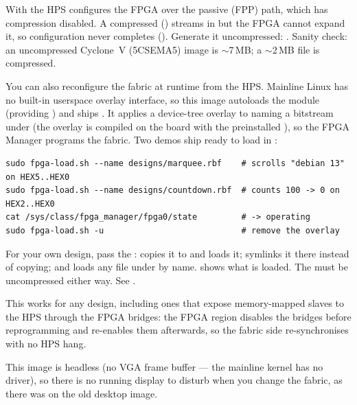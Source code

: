\begin{warn}
With  the HPS configures the FPGA over the passive (FPP) path,
which has compression disabled. A compressed 
() streams in but the FPGA cannot expand it, so
configuration never completes (). Generate it uncompressed:
. Sanity
check: an uncompressed Cyclone~V (5CSEMA5) image is $\sim$7\,MB; a $\sim$2\,MB file
is compressed.
\end{warn}

\begin{note}
You can also reconfigure the fabric at runtime from the HPS. Mainline Linux has no
built-in userspace overlay interface, so this image autoloads the 
module (providing ) and ships
. It applies a device-tree overlay to
 naming a bitstream under 
(the overlay is compiled on the board with the preinstalled ), so the
FPGA Manager programs the fabric. Two demos ship ready to load in
:
\begin{lstlisting}
sudo fpga-load.sh --name designs/marquee.rbf    # scrolls "debian 13" on HEX5..HEX0
sudo fpga-load.sh --name designs/countdown.rbf  # counts 100 -> 0 on HEX2..HEX0
cat /sys/class/fpga_manager/fpga0/state         # -> operating
sudo fpga-load.sh -u                            # remove the overlay
\end{lstlisting}
For your own design, pass the : 
copies it to  and loads it;
 symlinks it there instead of copying; and
 loads any file under  by name.
 shows what is loaded. The  must be
uncompressed either way. See .

This works for any design, including ones that expose memory-mapped slaves to
the HPS through the FPGA bridges: the FPGA region disables the bridges before
reprogramming and re-enables them afterwards, so the fabric side re-synchronises
with no HPS hang.
\end{note}
This image is headless (no VGA frame buffer --- the mainline kernel has no
 driver), so there is no running display to disturb when you change
the fabric, as there was on the old desktop image.

